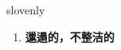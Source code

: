 
\begin{frame}
{\huge slovenly}
\begin{center}
\begin{enumerate}\Large
  \item \textbf{邋遢的，不整洁的}
\end{enumerate}
\end{center}
\end{frame}
